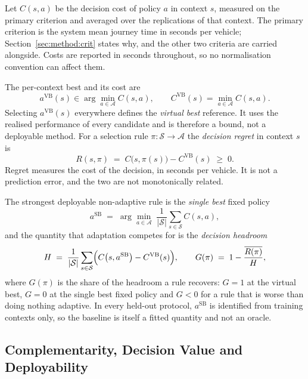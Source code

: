 \documentclass[preprint,12pt]{elsarticle}
\begin{document}
Let $C(s,a)$ be the decision cost of policy $a$ in context $s$, measured on the
primary criterion and averaged over the replications of that context. The
primary criterion is the system mean journey time in seconds per vehicle;
Section~\ref{sec:method:crit} states why, and the other two criteria are carried
alongside. Costs are reported in seconds throughout, so no normalisation
convention can affect them.

The per-context best and its cost are
\begin{equation}
a^{\mathrm{VB}}(s) \in \arg\min_{a \in \mathcal{A}} C(s,a),
\qquad
C^{\mathrm{VB}}(s) = \min_{a \in \mathcal{A}} C(s,a).
\label{eq:vbs}
\end{equation}
Selecting $a^{\mathrm{VB}}(s)$ everywhere defines the \emph{virtual best}
reference. It uses the realised performance of every candidate and is therefore
a bound, not a deployable method. For a selection rule
$\pi : \mathcal{S} \to \mathcal{A}$ the \emph{decision regret} in context $s$ is
\begin{equation}
R(s,\pi) \;=\; C\bigl(s,\pi(s)\bigr) - C^{\mathrm{VB}}(s) \;\ge\; 0 .
\label{eq:regret}
\end{equation}
Regret measures the cost of the decision, in seconds per vehicle. It is not a
prediction error, and the two are not monotonically related.

The strongest deployable non-adaptive rule is the \emph{single best} fixed
policy
\begin{equation}
a^{\mathrm{SB}} \;=\; \arg\min_{a \in \mathcal{A}}\;
\frac{1}{|\mathcal{S}|}\sum_{s \in \mathcal{S}} C(s,a),
\label{eq:sbs}
\end{equation}
and the quantity that adaptation competes for is the \emph{decision headroom}
\begin{equation}
H \;=\; \frac{1}{|\mathcal{S}|}\sum_{s \in \mathcal{S}}
\Bigl( C\bigl(s,a^{\mathrm{SB}}\bigr) - C^{\mathrm{VB}}(s) \Bigr),
\qquad
G(\pi) \;=\; 1 - \frac{\overline{R(\pi)}}{H},
\label{eq:headroom}
\end{equation}
where $G(\pi)$ is the share of the headroom a rule recovers: $G=1$ at the
virtual best, $G=0$ at the single best fixed policy and $G<0$ for a rule that is
worse than doing nothing adaptive. In every held-out protocol,
$a^{\mathrm{SB}}$ is identified from training contexts only, so the baseline is
itself a fitted quantity and not an oracle.

\subsection{Complementarity, Decision Value and Deployability}
\label{sec:problem:three}
\end{document}
